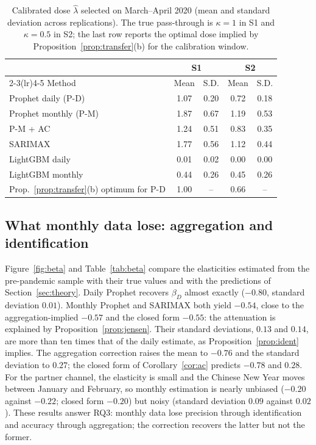 \documentclass{article}
\theoremstyle{plain}
\theoremstyle{definition}
\theoremstyle{remark}
\begin{document}
\begin{table}[t]
\centering\small
\caption{Calibrated dose $\hat\lambda$ selected on March--April 2020 (mean and standard deviation across replications). The true pass-through is $\kappa=1$ in S1 and $\kappa=0.5$ in S2; the last row reports the optimal dose implied by Proposition~\ref{prop:transfer}(b) for the calibration window.}
\label{tab:lamhat}
\begin{tabular}{lcccc}
\toprule
 & \multicolumn{2}{c}{S1} & \multicolumn{2}{c}{S2} \\
\cmidrule(lr){2-3}\cmidrule(lr){4-5}
Method & Mean & S.D. & Mean & S.D. \\
\midrule
Prophet daily (P-D) & 1.07 & 0.20 & 0.72 & 0.18 \\
Prophet monthly (P-M) & 1.87 & 0.67 & 1.19 & 0.53 \\
P-M + AC & 1.24 & 0.51 & 0.83 & 0.35 \\
SARIMAX & 1.77 & 0.56 & 1.12 & 0.44 \\
LightGBM daily & 0.01 & 0.02 & 0.00 & 0.00 \\
LightGBM monthly & 0.44 & 0.26 & 0.45 & 0.26 \\
\midrule
Prop.~\ref{prop:transfer}(b) optimum for P-D & 1.00 & -- & 0.66 & -- \\
\bottomrule
\end{tabular}
\end{table}

\subsection{What monthly data lose: aggregation and identification}
Figure~\ref{fig:beta} and Table~\ref{tab:beta} compare the elasticities estimated from the pre-pandemic sample with their true values and with the predictions of Section~\ref{sec:theory}. Daily Prophet recovers $\beta_D$ almost exactly ($-0.80$, standard deviation $0.01$). Monthly Prophet and SARIMAX both yield $-0.54$, close to the aggregation-implied $-0.57$ and the closed form $-0.55$: the attenuation is explained by Proposition~\ref{prop:jensen}. Their standard deviations, $0.13$ and $0.14$, are more than ten times that of the daily estimate, as Proposition~\ref{prop:ident} implies. The aggregation correction raises the mean to $-0.76$ and the standard deviation to $0.27$; the closed form of Corollary~\ref{cor:ac} predicts $-0.78$ and $0.28$. For the partner channel, the elasticity is small and the Chinese New Year moves between January and February, so monthly estimation is nearly unbiased ($-0.20$ against $-0.22$; closed form $-0.20$) but noisy (standard deviation $0.09$ against $0.02$). These results answer RQ3: monthly data lose precision through identification and accuracy through aggregation; the correction recovers the latter but not the former.
\end{document}
